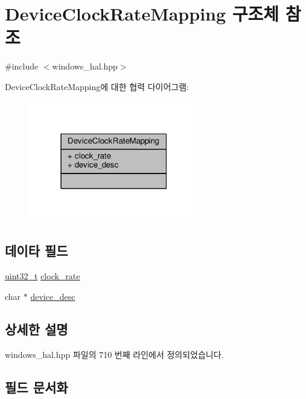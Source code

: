 \hypertarget{struct_device_clock_rate_mapping}{}\section{Device\+Clock\+Rate\+Mapping 구조체 참조}
\label{struct_device_clock_rate_mapping}


{\ttfamily \#include $<$windows\+\_\+hal.\+hpp$>$}



Device\+Clock\+Rate\+Mapping에 대한 협력 다이어그램\+:
\nopagebreak
\begin{figure}[H]
\begin{center}
\leavevmode
\includegraphics[width=211pt]{struct_device_clock_rate_mapping__coll__graph}
\end{center}
\end{figure}
\subsection*{데이타 필드}
\begin{DoxyCompactItemize}
\item 
\hyperlink{parse_8c_a6eb1e68cc391dd753bc8ce896dbb8315}{uint32\+\_\+t} \hyperlink{struct_device_clock_rate_mapping_a4ff69d868409c6c16c86cab87ee0a3bf}{clock\+\_\+rate}
\item 
char $\ast$ \hyperlink{struct_device_clock_rate_mapping_af296ea48c692225a5d06a2675a82b0df}{device\+\_\+desc}
\end{DoxyCompactItemize}


\subsection{상세한 설명}


windows\+\_\+hal.\+hpp 파일의 710 번째 라인에서 정의되었습니다.



\subsection{필드 문서화}
